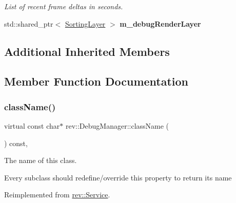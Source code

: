 \begin{Indent}
\begin{DoxyCompactItemize}
\begin{DoxyCompactList}\small\item\em List of recent frame deltas in seconds. \end{DoxyCompactList}\item 
\mbox{\label{classrev_1_1_debug_manager_a6a1f6843ff2981ebc64a97dffcf0d815}} 
std\+::shared\+\_\+ptr$<$ \mbox{\hyperlink{structrev_1_1_sorting_layer}{Sorting\+Layer}} $>$ {\bfseries m\+\_\+debug\+Render\+Layer}
\end{DoxyCompactItemize}
\end{Indent}
\subsection*{Additional Inherited Members}


\subsection{Member Function Documentation}
\mbox{\label{classrev_1_1_debug_manager_a5962e13755e5a3b902f2d3f71e5948cb}} 
\subsubsection{\texorpdfstring{className()}{className()}}
{\footnotesize\ttfamily virtual const char$\ast$ rev\+::\+Debug\+Manager\+::class\+Name (\begin{DoxyParamCaption}{ }\end{DoxyParamCaption}) const\hspace{0.3cm}{\ttfamily [inline]}, {\ttfamily [virtual]}}



The name of this class. 

Every subclass should redefine/override this property to return its name 

Reimplemented from \mbox{\hyperlink{classrev_1_1_service_a484d71757ea6e8780488602cb421a4a5}{rev\+::\+Service}}.

\mbox{\label{classrev_1_1_debug_manager_aa7e0385a031c216c48f6bf1d9ca2a9da}} 
